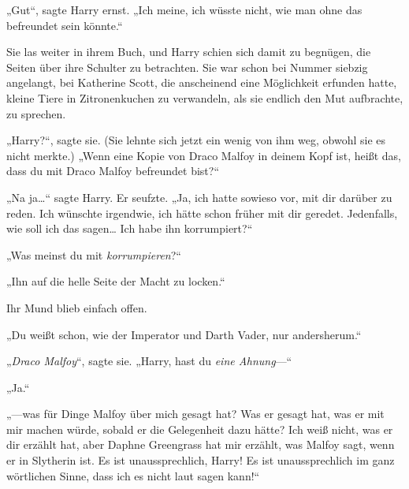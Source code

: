 „Gut“, sagte Harry ernst. „Ich meine, ich wüsste nicht, wie man ohne das befreundet sein könnte.“


Sie las weiter in ihrem Buch, und Harry schien sich damit zu begnügen, die Seiten über ihre Schulter zu betrachten. Sie war schon bei Nummer siebzig angelangt, bei Katherine Scott, die anscheinend eine Möglichkeit erfunden hatte, kleine Tiere in Zitronenkuchen zu verwandeln, als sie endlich den Mut aufbrachte, zu sprechen.

„Harry?“, sagte sie. (Sie lehnte sich jetzt ein wenig von ihm weg, obwohl sie es nicht merkte.) „Wenn eine Kopie von Draco Malfoy in deinem Kopf ist, heißt das, dass du mit Draco Malfoy befreundet bist?“

„Na ja…“ sagte Harry. Er seufzte. „Ja, ich hatte sowieso vor, mit dir darüber zu reden. Ich wünschte irgendwie, ich hätte schon früher mit dir geredet. Jedenfalls, wie soll ich das sagen… Ich habe ihn korrumpiert?“

„Was meinst du mit \emph{korrumpieren}?“

„Ihn auf die helle Seite der Macht zu locken.“

Ihr Mund blieb einfach offen.

„Du weißt schon, wie der Imperator und Darth Vader, nur andersherum.“

„\emph{Draco Malfoy}“, sagte sie. „Harry, hast du \emph{eine Ahnung}—“

„Ja.“

„—was für Dinge Malfoy über mich gesagt hat? Was er gesagt hat, was er mit mir machen würde, sobald er die Gelegenheit dazu hätte? Ich weiß nicht, was er dir erzählt hat, aber Daphne Greengrass hat mir erzählt, was Malfoy sagt, wenn er in Slytherin ist. Es ist unaussprechlich, Harry! Es ist unaussprechlich im ganz wörtlichen Sinne, dass ich es nicht laut sagen kann!“

